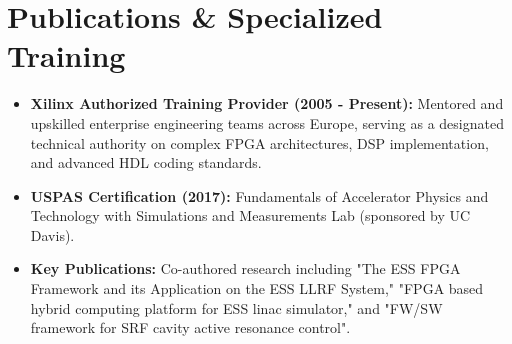 \documentclass[10pt, letterpaper]{article}
\begin{document}
\section*{Publications \& Specialized Training}
\begin{itemize}[leftmargin=*, nosep]
    \item \textbf{Xilinx Authorized Training Provider (2005 - Present):} Mentored and upskilled enterprise engineering teams across Europe, serving as a designated technical authority on complex FPGA architectures, DSP implementation, and advanced HDL coding standards.
    \item \textbf{USPAS Certification (2017):} Fundamentals of Accelerator Physics and Technology with Simulations and Measurements Lab (sponsored by UC Davis).
    \item \textbf{Key Publications:} Co-authored research including "The ESS FPGA Framework and its Application on the ESS LLRF System," "FPGA based hybrid computing platform for ESS linac simulator," and "FW/SW framework for SRF cavity active resonance control".
\end{itemize}
\end{document}
